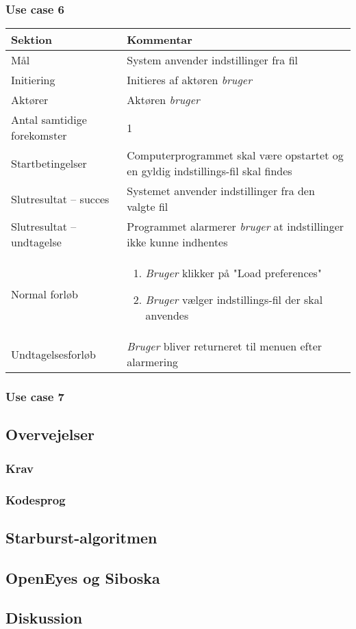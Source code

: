 \documentclass[rapport.tex]{subfiles}
\begin{document}
		\subsubsection{Use case 6}
		\begin{tabular}{|l|p{7.7cm}|}
			\hline \textbf{Sektion} 	& \textbf{Kommentar} \\ 
			\hline Mål  & System anvender indstillinger fra fil \\ 
			\hline Initiering  & Initieres af aktøren \textit{bruger} \\ 
			\hline Aktører & Aktøren \textit{bruger} \\ 
			\hline Antal samtidige forekomster & 1 \\ 
			\hline Startbetingelser & Computerprogrammet skal være opstartet og en gyldig indstillings-fil skal findes  \\ 
			\hline Slutresultat – succes & Systemet anvender indstillinger fra den valgte fil \\ 
			\hline Slutresultat – undtagelse & Programmet alarmerer \textit{bruger} at indstillinger ikke kunne indhentes \\ 
			\hline Normal forløb & \begin{enumerate}
				\item \textit{Bruger} klikker på "Load preferences"
				\item \textit{Bruger} vælger indstillings-fil der skal anvendes
			\end{enumerate} \\ 
			\hline Undtagelsesforløb & \textit{Bruger} bliver returneret til menuen efter alarmering \\ 
			\hline 
		\end{tabular}
		\subsubsection{Use case 7}
	\subsection{Overvejelser}
		\subsubsection{Krav}
		\subsubsection{Kodesprog}
	\subsection{Starburst-algoritmen}
	\subsection{OpenEyes og Siboska}
	\subsection{Diskussion}
		
\end{document}
